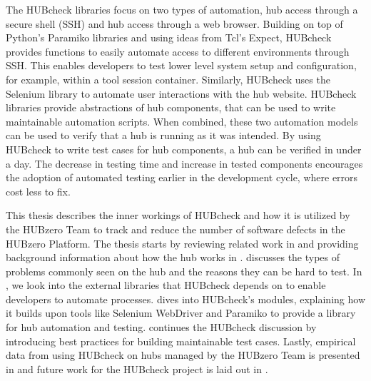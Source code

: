 The HUBcheck libraries focus on two types of automation, hub access through a
secure shell (SSH) and hub access through a web browser. Building on top of
Python's Paramiko libraries and using ideas from Tcl's Expect, HUBcheck
provides functions to easily automate access to different environments through
SSH. This enables developers to test lower level system setup and
configuration, for example, within a tool session container. Similarly,
HUBcheck uses the Selenium library to automate user interactions with the hub
website.  HUBcheck libraries provide abstractions of hub components, that can
be used to write maintainable automation scripts. When combined, these two
automation models can be used to verify that a hub is running as it was
intended.  By using HUBcheck to write test cases for hub components, a hub can
be verified in under a day. The decrease in testing time and increase in tested
components encourages the adoption of automated testing earlier in the
development cycle, where errors cost less to fix.

This thesis describes the inner workings of HUBcheck and how it is utilized by
the HUBzero Team to track and reduce the number of software defects in the
HUBzero Platform. The thesis starts by reviewing related work in
 and providing background information about how the hub
works in .   discusses the types of
problems commonly seen on the hub and the reasons they can be hard to test.  In
, we look into the external libraries that
HUBcheck depends on to enable developers to automate processes.
 dives into HUBcheck's modules, explaining how it builds
upon tools like Selenium WebDriver and Paramiko to provide a library for hub
automation and testing.  continues the HUBcheck
discussion by introducing best practices for building maintainable test cases.
Lastly, empirical data from using HUBcheck on hubs managed by the HUBzero Team
is presented in  and future work for the HUBcheck project
is laid out in .


%
%

%


